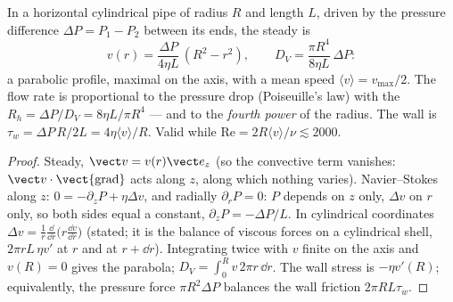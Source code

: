 \begin{proposition}\label{prop:b2:viscous-flows:poiseuille}
In a horizontal cylindrical pipe of radius $R$ and length $L$, driven by
the pressure difference $\Delta P = P_1 - P_2$ between its ends, the steady
 is
\[
v(r) = \frac{\Delta P}{4\eta L}\,(R^2 - r^2) , \qquad
D_V = \frac{\pi R^4}{8\eta L}\,\Delta P :
\]
a parabolic profile, maximal on the axis, with a mean speed
$\langle v\rangle = v_{\max}/2$. The flow rate is proportional to the
pressure drop (Poiseuille's law) with the \emph{}
$R_h = \Delta P/D_V = 8\eta L/\pi R^4$ --- and to the \emph{fourth power} of
the radius. The wall  is $\tau_w = \Delta P\,R/2L = 4\eta\langle v
\rangle/R$. Valid while $\mathrm{Re} = 2R\langle v\rangle/\nu \lesssim 2000$.
\end{proposition}

\begin{proof}
Steady, $\vect v = v(r)\vect e_z$ (so the convective term vanishes: $\vect v
\cdot\operatorname{\vect{grad}}$ acts along $z$, along which nothing
varies). Navier--Stokes along $z$: $0 = -\partial_zP + \eta\Delta v$, and
radially $\partial_rP = 0$: $P$ depends on $z$ only, $\Delta v$ on $r$ only, so
both sides equal a constant, $\partial_zP = -\Delta P/L$. In cylindrical
coordinates $\Delta v = \frac1r\frac{\dd}{\dd r}\bigl(r\frac{\dd v}{\dd r}\bigr)$
(stated; it is the balance of viscous forces on a cylindrical shell,
$2\pi rL\,\eta v'$ at $r$ and at $r + \dd r$). Integrating twice with $v$
finite on the axis and $v(R) = 0$ gives the parabola; $D_V = \int_0^Rv\,2\pi
r\,\dd r$. The wall stress is $-\eta v'(R)$; equivalently, the pressure
force $\pi R^2\Delta P$ balances the wall friction $2\pi RL\tau_w$.
\end{proof}


